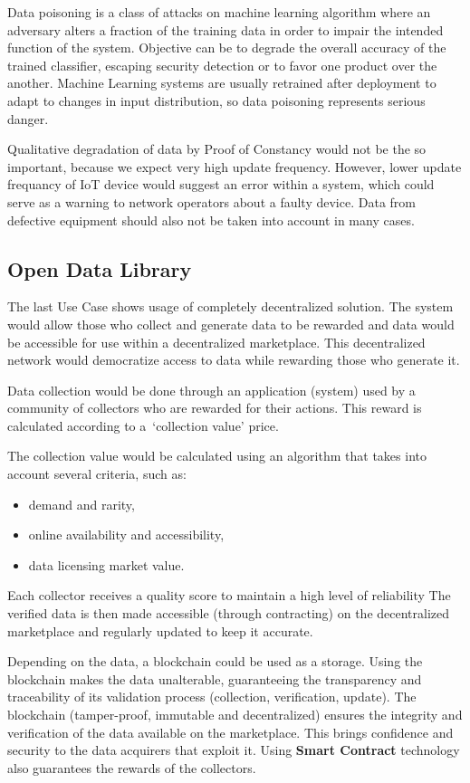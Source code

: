 Data poisoning is a class of attacks on machine learning algorithm where an adversary alters a fraction of the training data in order to impair the intended function of the system.
Objective can be to degrade the overall accuracy of the trained classifier, escaping security detection or to favor one product over the another.
Machine Learning systems are usually retrained after deployment to adapt to changes in input distribution, so data poisoning represents serious danger.

Qualitative degradation of data by Proof of Constancy would not be the so important, because we expect very high update frequency.
However, lower update frequancy of IoT device would suggest an error within a system, which could serve as a warning to network operators about a faulty device.
Data from defective equipment should also not be taken into account in many cases.

\subsection{Open Data Library}

The last Use Case shows usage of completely decentralized solution.
The system would allow those who collect and generate data to be rewarded and data would be accessible for use within a decentralized marketplace.
This decentralized network would democratize access to data while rewarding those who generate it.

Data collection would be done through an application (system) used by a community of collectors who are rewarded for their actions.
This reward is calculated according to a~\enquote*{collection value} price.

The collection value would be calculated using an algorithm that takes into account several criteria, such as:
\begin{itemize}
    \item demand and rarity,
    \item online availability and accessibility,
    \item data licensing market value.
\end{itemize}

Each collector receives a quality score to maintain a high level of reliability
The verified data is then made accessible (through contracting) on the decentralized marketplace and regularly updated to keep it accurate.

Depending on the data, a blockchain could be used as a storage.
Using the blockchain makes the data unalterable, guaranteeing the transparency and traceability of its validation process (collection, verification, update).
The blockchain (tamper-proof, immutable and decentralized) ensures the integrity and verification of the data available on the marketplace.
This brings confidence and security to the data acquirers that exploit it. 
Using \textbf{Smart Contract} technology also guarantees the rewards of the collectors.

